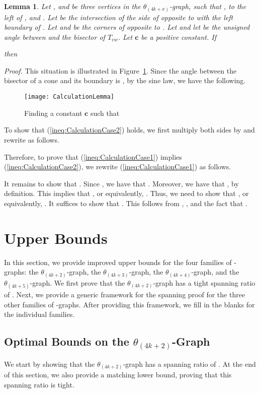 \documentclass[12pt]{article}
\newtheorem{lem}[defin]{Lemma}
\newenvironment{lemma}{\begin{lem} \sl}{\end{lem}}
\newenvironment{proof}{\emph{Proof.}}{\hfill \\}
\newcommand{\Graph}[1]{\ensuremath{\theta_{(4 k + #1)}}-Graph\xspace}
\newcommand{\graph}[1]{\ensuremath{\theta_{(4 k + #1)}}-graph\xspace}
\newcommand{\canon}[2]{\ensuremath{T_{#1 #2}}}
\newcommand{\const}{\ensuremath{\boldsymbol{c}}\xspace}
\begin{document}
\begin{lemma}
  \label{lem:CalculationCase}
  Let ,  and  be three vertices in the \graph{x}, such that ,  to the left of , and . Let  be the intersection of the side of  opposite to  with the left boundary of . Let  and  be the corners of  opposite to . Let  and let  be the unsigned angle between  and the bisector of \canon{v}{w}. Let \const be a positive constant. If 
  
  then 
  
\end{lemma}
\begin{proof}
  This situation is illustrated in Figure~\ref{fig:CalculationLemma}. Since the angle between the bisector of a cone and its boundary is , by the sine law, we have the following. 
  

  \begin{figure}[ht]
    \begin{center}
      \texttt{[image: CalculationLemma]}
    \end{center}
    \caption{Finding a constant \const such that }
    \label{fig:CalculationLemma}
  \end{figure}

  \noindent To show that (\ref{ineq:CalculationCase2}) holds, we first multiply both sides by  and rewrite as follows. 
  
  
  Therefore, to prove that (\ref{ineq:CalculationCase1}) implies (\ref{ineq:CalculationCase2}), we rewrite (\ref{ineq:CalculationCase1}) as follows. 
   

  It remains to show that . Since , we have that \mbox{}. Moreover, we have that , by definition. This implies that , or equivalently, . Thus, we need to show that , or equivalently, . It suffices to show that . This follows from , , and the fact that . 
\end{proof}


\section{Upper Bounds}
In this section, we provide improved upper bounds for the four families of -graphs: the \graph{2}, the \graph{3}, the \graph{4}, and the \graph{5}. We first prove that the \graph{2} has a tight spanning ratio of . Next, we provide a generic framework for the spanning proof for the three other families of -graphs. After providing this framework, we fill in the blanks for the individual families. 


\subsection{Optimal Bounds on the \Graph{2}}
\label{subsec:Theta4k+2}
We start by showing that the \graph{2} has a spanning ratio of . At the end of this section, we also provide a matching lower bound, proving that this spanning ratio is tight. 
\end{document}
